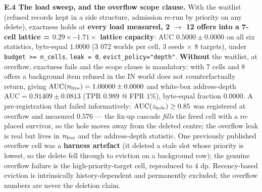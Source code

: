\documentclass{article}
\begin{document}
\textbf{E.4 The load sweep, and the overflow scope clause.} With the waitlist (refused records kept in a side structure, admission re-run by priority on any delete), exactness holds at \textbf{every load measured, 2 $\to$ 12 offers into a 7-cell lattice = $0.29\times$--$1.71\times$ lattice capacity}: AUC $0.5000\pm0.0000$ on all six statistics, byte-equal $1.0000$ (3 072 worlds per cell, 3 seeds $\times$ 8 targets), under \texttt{budget >= n\_cells}, \texttt{leak = 0}, \texttt{evict\_policy="depth"}. \textbf{Without} the waitlist, at overflow, exactness fails and the scope clause is mandatory: with 7 cells and 8 offers a background item refused in the IN world does not counterfactually return, giving $\mathrm{AUC}(n_{\rm live})=1.00000\pm0.0000$ and white-box address-depth $\mathrm{AUC}=0.91409\pm0.0813$ (TPR $0.989$ @ FPR $1\%$), byte-equal fraction $0.0000$. A pre-registration that failed informatively: $\mathrm{AUC}(z_{\rm hole})\ge0.85$ was registered at overflow and measured $0.576$ --- the fix-up cascade \emph{fills} the freed cell with a re-placed survivor, so the hole moves away from the deleted centre; the overflow leak is real but lives in $n_{\rm live}$ and the address-depth statistic. One previously published overflow cell was a \textbf{harness artefact} (it deleted a stale slot whose priority is lowest, so the delete fell through to eviction on a background row); the genuine overflow failure is the high-priority-target cell, reproduced to 4 dp. Recency-based eviction is intrinsically history-dependent and permanently excluded; the overflow numbers are never the deletion claim.
\end{document}
